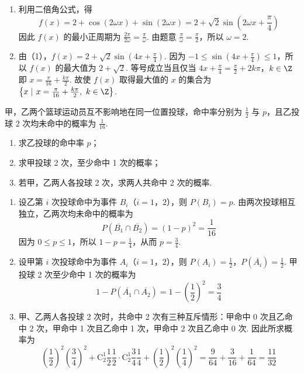 \begin{solution}
\begin{enumerate}
\item 利用二倍角公式，得
\[
f(x)=2+\cos(2\omega x)+\sin(2\omega x)=2+\sqrt{2}\sin\left(2\omega x+\frac{\pi}{4}\right)
\]
因此 \(f(x)\) 的最小正周期为 \(\frac{2\pi}{2\omega}=\frac{\pi}{\omega}\). 由题意 \(\frac{\pi}{\omega}=\frac{\pi}{2}\)，所以 \(\omega=2\).
\item 由（1），\(f(x)=2+\sqrt{2}\sin\left(4x+\frac{\pi}{4}\right)\). 因为 \(-1\leqslant\sin\left(4x+\frac{\pi}{4}\right)\leqslant1\)，所以 \(f(x)\) 的最大值为 \(2+\sqrt{2}\). 等号成立当且仅当
\(4x+\frac{\pi}{4}=\frac{\pi}{2}+2k\pi\)，\(k\in\Z\)
即 \(x=\frac{\pi}{16}+\frac{k\pi}{2}\). 故使 \(f(x)\) 取得最大值的 \(x\) 的集合为 \(\left\{x\mathrel{\left|\right.}x=\frac{\pi}{16}+\frac{k\pi}{2},\ k\in\Z\right\}\).
\end{enumerate}
\end{solution}

\begin{problem}
甲，乙两个篮球运动员互不影响地在同一位置投球，命中率分别为 \(\frac{1}{2}\) 与 \(p\)，且乙投球 2 次均未命中的概率为 \(\frac{1}{16}\).
\begin{enumerate}
\item 求乙投球的命中率 \(p\)；
\item 求甲投球 2 次，至少命中 1 次的概率；
\item 若甲，乙两人各投球 2 次，求两人共命中 2 次的概率.
\end{enumerate}
\end{problem}

\begin{solution}
\begin{enumerate}
\item 设乙第 \(i\) 次投球命中为事件 \(B_i\)（\(i=1\)，\(2\)），则 \(P(B_i)=p\). 由两次投球相互独立，乙两次均未命中的概率为
\[
P(\overline{B_1}\cap\overline{B_2})=(1-p)^2=\frac{1}{16}
\]
因为 \(0\leqslant p\leqslant1\)，所以 \(1-p=\frac{1}{4}\)，从而 \(p=\frac{3}{4}\).
\item 设甲第 \(i\) 次投球命中为事件 \(A_i\)（\(i=1\)，\(2\)），则 \(P(A_i)=\frac{1}{2}\)，\(P(\overline{A_i})=\frac{1}{2}\). 甲投球 2 次至少命中 1 次的概率为
\[
1-P(\overline{A_1}\cap\overline{A_2})=1-\left(\frac{1}{2}\right)^2=\frac{3}{4}
\]
\item 甲、乙两人各投球 2 次时，共命中 2 次有三种互斥情形：甲命中 0 次且乙命中 2 次，甲命中 1 次且乙命中 1 次，甲命中 2 次且乙命中 0 次. 因此所求概率为
\[
\left(\frac{1}{2}\right)^2\left(\frac{3}{4}\right)^2+\mathrm C_2^1\frac{1}{2}\frac{1}{2}\cdot\mathrm C_2^1\frac{3}{4}\frac{1}{4}+\left(\frac{1}{2}\right)^2\left(\frac{1}{4}\right)^2=\frac{9}{64}+\frac{3}{16}+\frac{1}{64}=\frac{11}{32}
\]
\end{enumerate}
\end{solution}

